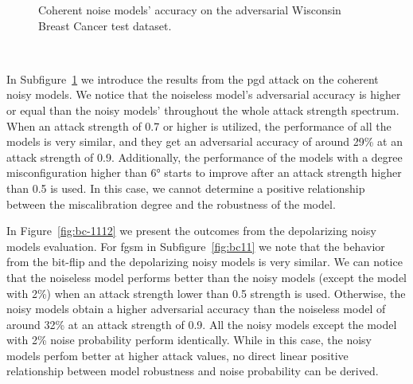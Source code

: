 \begin{figure}[!h]
\begin{subfigure}{0.45\textwidth}
      \label{fig:bc10}
  \end{subfigure}
  \caption{Coherent noise models' accuracy on the adversarial Wisconsin Breast Cancer test dataset.}
  \label{fig:bc-910}
\end{figure} \

In Subfigure~\ref{fig:bc10} we introduce the results from the \ac{pgd}
attack on the coherent noisy models. We notice that the noiseless
model's adversarial accuracy is higher or equal than the noisy
models' throughout the whole attack strength spectrum. When an attack
strength of 0.7 or higher is utilized, the performance of all the models
is very similar, and they get an adversarial accuracy of around 29\%
at an attack strength of 0.9. Additionally, the performance of the
models with a degree misconfiguration higher than 6° starts to improve
after an attack strength higher than 0.5 is used. In this case, we
cannot determine a positive relationship between the miscalibration
degree and the robustness of the model. \

In Figure~\ref{fig:bc-1112} we present the outcomes from the depolarizing
noisy models evaluation. For \ac{fgsm} in Subfigure~\ref{fig:bc11}
we note that the behavior from the bit-flip and the depolarizing
noisy models is very similar. We can notice that the noiseless
model performs better than the noisy models (except the model with
2\%) when an attack strength lower than 0.5 strength is used.
Otherwise, the noisy models obtain a higher adversarial accuracy
than the noiseless model of around 32\% at an attack strength of 0.9.
All the noisy models except the model with 2\% noise probability
perform identically. While in this case, the noisy models perfom
better at higher attack values, no direct linear positive relationship
between model robustness and noise probability can be derived. \

